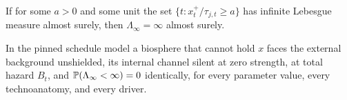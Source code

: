 \begin{corollary}\label{imp:overlap}
If for some $a>0$ and some unit the set $\{t:x_t^+/\tau_{j,t}\ge a\}$ has
infinite Lebesgue measure almost surely, then $\Lambda_\infty=\infty$
almost surely.
\end{corollary}

\begin{proposition}\label{imp:gating}
In the pinned schedule model a biosphere that cannot hold $x$ faces the
external background unshielded, its internal channel silent at zero
strength, at total hazard $B_t$, and $\mathbb{P}(\Lambda_\infty<\infty)=0$
identically, for every parameter value, every technoanatomy, and every
driver.
\end{proposition}


